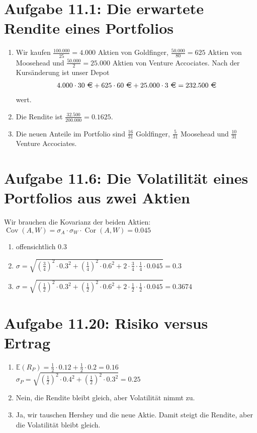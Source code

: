 \documentclass{article}
\newcommand{\E}{\mathbb{E}}
\DeclareMathOperator{\Cov}{Cov}
\DeclareMathOperator{\Cor}{Cor}
\begin{document}
	\section*{Aufgabe 11.1: Die erwartete Rendite eines Portfolios}
	\begin{enumerate}[label=(\alph*)]
		\item Wir kaufen $\frac{100.000}{25} = 4.000$ Aktien von Goldfinger, $\frac{50.000}{80} = 625$ Aktien von Moosehead und $\frac{50.000}{2} = 25.000$ Aktien von Venture Accociates. Nach der Kursänderung ist unser Depot
		\begin{align}
			4.000\cdot 30\text{ \EUR} + 625\cdot 60\text{ \EUR} + 25.000\cdot 3\text{ \EUR} = 232.500\text{ \EUR} \notag
		\end{align}
		wert.
		\item Die Rendite ist $\frac{32.500}{200.000} = 0.1625$.
		\item Die neuen Anteile im Portfolio sind $\frac{16}{31}$ Goldfinger, $\frac{5}{31}$ Moosehead und $\frac{10}{31}$ Venture Accociates.
	\end{enumerate}
	
	\section*{Aufgabe 11.6: Die Volatilität eines Portfolios aus zwei Aktien}
	Wir brauchen die Kovarianz der beiden Aktien: $\Cov(A,W) = \sigma_A\cdot\sigma_W\cdot \Cor(A,W) = 0.045$
	\begin{enumerate}[label=(\alph*)]
		\item offensichtlich 0.3
		\item $\sigma = \sqrt{\left(\frac{3}{4}\right)^2\cdot 0.3^2 + \left(\frac{1}{4}\right)^2\cdot 0.6^2 + 2\cdot \frac{3}{4}\cdot\frac{1}{4}\cdot 0.045} = 0.3$
		\item $\sigma = \sqrt{\left(\frac{1}{2}\right)^2\cdot 0.3^2 + \left(\frac{1}{2}\right)^2\cdot 0.6^2 + 2\cdot \frac{1}{2}\cdot\frac{1}{2}\cdot 0.045} = 0.3674$
	\end{enumerate}

	\section*{Aufgabe 11.20: Risiko versus Ertrag}
	\begin{enumerate}[label=(\alph*)]
		\item $\E(R_P) = \frac{1}{2}\cdot 0.12 + \frac{1}{2}\cdot 0.2 = 0.16$ \\
		$\sigma_P = \sqrt{\left(\frac{1}{2}\right)^2\cdot 0.4^2 + \left(\frac{1}{2}\right)^2\cdot 0.3^2}=0.25$
		\item Nein, die Rendite bleibt gleich, aber Volatilität nimmt zu.
		\item Ja, wir tauschen Hershey und die neue Aktie. Damit steigt die Rendite, aber die Volatilität bleibt gleich.
	\end{enumerate}
\end{document}
